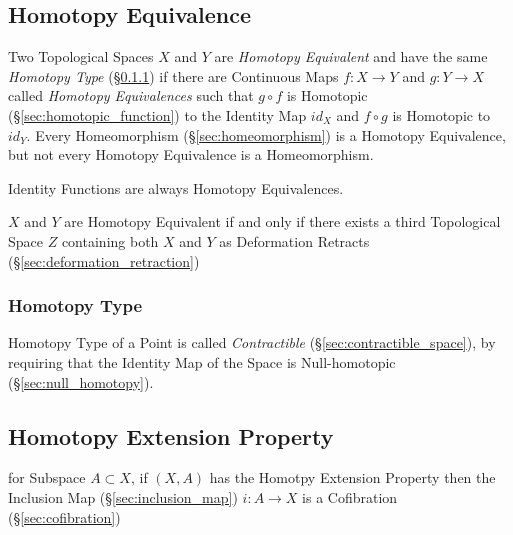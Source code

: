 \subsection{Homotopy Equivalence}\label{sec:homotopy_equivalence}

Two Topological Spaces $X$ and $Y$ are \emph{Homotopy Equivalent} and
have the same \emph{Homotopy Type} (\S\ref{sec:homotopy_type}) if
there are Continuous Maps $f : X \rightarrow Y$ and $g : Y \rightarrow
X$ called \emph{Homotopy Equivalences} such that $g \circ f$ is
Homotopic (\S\ref{sec:homotopic_function}) to the Identity Map $id_X$
and $f \circ g$ is Homotopic to $id_Y$. Every Homeomorphism
(\S\ref{sec:homeomorphism}) is a Homotopy Equivalence, but not every
Homotopy Equivalence is a Homeomorphism.

Identity Functions are always Homotopy Equivalences. %

$X$ and $Y$ are Homotopy Equivalent if and only if there exists a
third Topological Space $Z$ containing both $X$ and $Y$ as Deformation
Retracts (\S\ref{sec:deformation_retraction})



\subsubsection{Homotopy Type}\label{sec:homotopy_type}

Homotopy Type of a Point is called \emph{Contractible}
(\S\ref{sec:contractible_space}), by requiring that the Identity Map
of the Space is Null-homotopic (\S\ref{sec:null_homotopy}).



\subsection{Homotopy Extension Property}\label{sec:homotopy_extension}

for Subspace $A \subset X$, if $(X,A)$ has the Homotpy Extension
Property then the Inclusion Map (\S\ref{sec:inclusion_map}) $i : A
\rightarrow X$ is a Cofibration (\S\ref{sec:cofibration})



